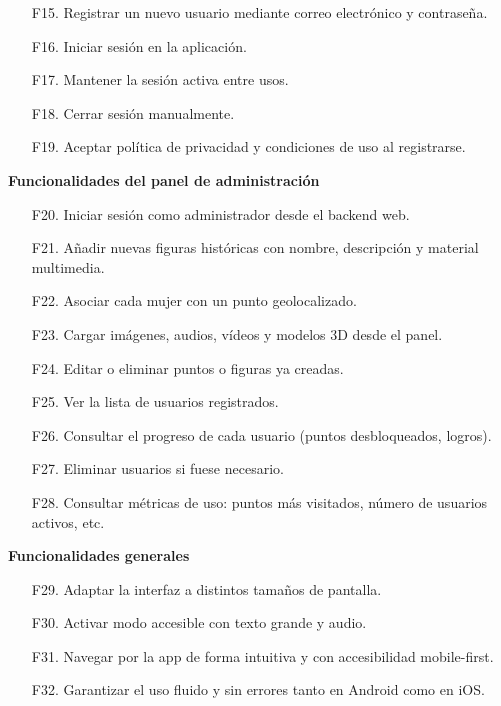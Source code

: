 \begin{itemize}
    \item[F15.] Registrar un nuevo usuario mediante correo electrónico y contraseña.
    \item[F16.] Iniciar sesión en la aplicación.
    \item[F17.] Mantener la sesión activa entre usos.
    \item[F18.] Cerrar sesión manualmente.
    \item[F19.] Aceptar política de privacidad y condiciones de uso al registrarse.
\end{itemize}

\textbf{\textsf{\large Funcionalidades del panel de administración}}

\begin{itemize}
    \item[F20.] Iniciar sesión como administrador desde el backend web.
    \item[F21.] Añadir nuevas figuras históricas con nombre, descripción y material multimedia.
    \item[F22.] Asociar cada mujer con un punto geolocalizado.
    \item[F23.] Cargar imágenes, audios, vídeos y modelos 3D desde el panel.
    \item[F24.] Editar o eliminar puntos o figuras ya creadas.
    \item[F25.] Ver la lista de usuarios registrados.
    \item[F26.] Consultar el progreso de cada usuario (puntos desbloqueados, logros).
    \item[F27.] Eliminar usuarios si fuese necesario.
    \item[F28.] Consultar métricas de uso: puntos más visitados, número de usuarios activos, etc.
\end{itemize}

\textbf{\textsf{\large Funcionalidades generales}}

\begin{itemize}
    \item[F29.] Adaptar la interfaz a distintos tamaños de pantalla.
    \item[F30.] Activar modo accesible con texto grande y audio.
    \item[F31.] Navegar por la app de forma intuitiva y con accesibilidad mobile-first.
    \item[F32.] Garantizar el uso fluido y sin errores tanto en Android como en iOS.
\end{itemize}


